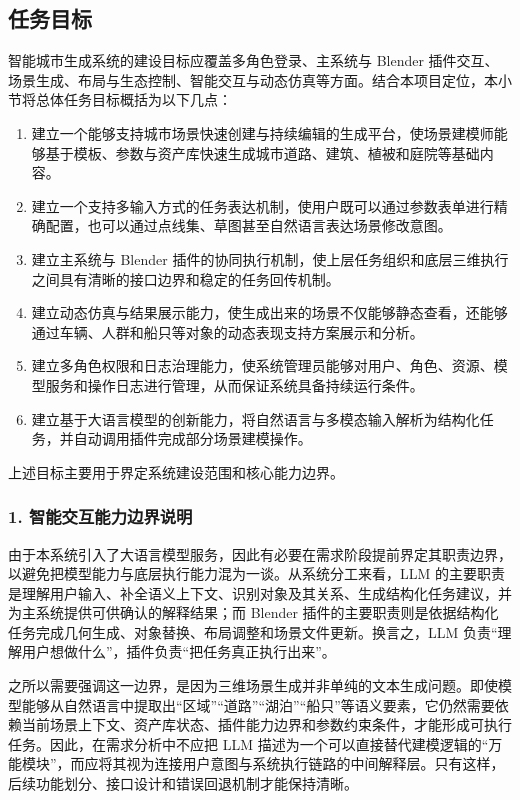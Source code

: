 \documentclass[UTF8,a4paper,10pt]{ctexart}
\begin{document}
\subsection{任务目标}
智能城市生成系统的建设目标应覆盖多角色登录、主系统与 Blender 插件交互、场景生成、布局与生态控制、智能交互与动态仿真等方面。结合本项目定位，本小节将总体任务目标概括为以下几点：
\begin{enumerate}[label=\arabic*.]
    \item 建立一个能够支持城市场景快速创建与持续编辑的生成平台，使场景建模师能够基于模板、参数与资产库快速生成城市道路、建筑、植被和庭院等基础内容。
    \item 建立一个支持多输入方式的任务表达机制，使用户既可以通过参数表单进行精确配置，也可以通过点线集、草图甚至自然语言表达场景修改意图。
    \item 建立主系统与 Blender 插件的协同执行机制，使上层任务组织和底层三维执行之间具有清晰的接口边界和稳定的任务回传机制。
    \item 建立动态仿真与结果展示能力，使生成出来的场景不仅能够静态查看，还能够通过车辆、人群和船只等对象的动态表现支持方案展示和分析。
    \item 建立多角色权限和日志治理能力，使系统管理员能够对用户、角色、资源、模型服务和操作日志进行管理，从而保证系统具备持续运行条件。
    \item 建立基于大语言模型的创新能力，将自然语言与多模态输入解析为结构化任务，并自动调用插件完成部分场景建模操作。
\end{enumerate}

上述目标主要用于界定系统建设范围和核心能力边界。

\subsubsection*{1. 智能交互能力边界说明}
由于本系统引入了大语言模型服务，因此有必要在需求阶段提前界定其职责边界，以避免把模型能力与底层执行能力混为一谈。从系统分工来看，LLM 的主要职责是理解用户输入、补全语义上下文、识别对象及其关系、生成结构化任务建议，并为主系统提供可供确认的解释结果；而 Blender 插件的主要职责则是依据结构化任务完成几何生成、对象替换、布局调整和场景文件更新。换言之，LLM 负责“理解用户想做什么”，插件负责“把任务真正执行出来”。

之所以需要强调这一边界，是因为三维场景生成并非单纯的文本生成问题。即使模型能够从自然语言中提取出“区域”“道路”“湖泊”“船只”等语义要素，它仍然需要依赖当前场景上下文、资产库状态、插件能力边界和参数约束条件，才能形成可执行任务。因此，在需求分析中不应把 LLM 描述为一个可以直接替代建模逻辑的“万能模块”，而应将其视为连接用户意图与系统执行链路的中间解释层。只有这样，后续功能划分、接口设计和错误回退机制才能保持清晰。
\end{document}
